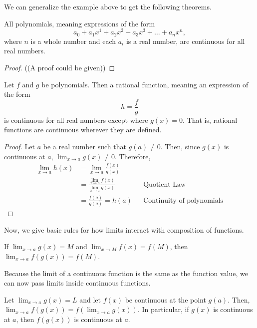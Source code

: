 \documentclass{ximera}
\begin{document}
We can generalize the example above to get the following theorems.

\begin{theorem}
  All polynomials, meaning expressions of the form
  \[
  a_0+a_1x^1+a_2x^2+a_3x^3+\dots+a_nx^n,
  \]
  where $n$ is a whole number and each $a_i$ is a real number, are
  continuous for all real numbers.
  \begin{proof}
   ((A proof could be given))
  \end{proof}
\end{theorem}

\begin{theorem} 
  Let $f$ and $g$ be polynomials.  Then a rational function, meaning an
  expression of the form
  \[
  h=\frac{f}{g}
  \]
  is continuous for all real numbers except where $g(x)=0$.  That is,
  rational functions are continuous wherever they are defined.

\begin{proof}
      Let $a$ be a real number such that $g(a)\neq 0$.  Then, since
      $g(x)$ is continuous at $a$, $\lim_{x\to a} g(x) \neq 0$.
      Therefore,
      \begin{align*}
        \lim_{x \to a} h(x) &= \lim_{x\to a} \frac{f(x)}{g(x)} &&\\
        &= \frac{\lim_{x\to a} f(x)}{ \lim_{x\to a} g(x)} && \text{Quotient Law}\\
        &= \frac{f(a)}{g(a)}=h(a) && \text{Continuity of polynomials}
      \end{align*}
\end{proof}
\end{theorem}


Now, we give basic rules for how limits interact with composition
of functions.

\begin{theorem}
  If $\lim_{x\to a}g(x)=M$ and $\lim_{x\to M}f(x) = f(M)$, then
  $\lim_{x\to a} f(g(x)) = f(M)$.
\end{theorem}

Because the limit of a continuous function is the same as the function
value, we can now pass limits inside continuous functions.

\begin{theorem}\label{theorem:continuity}
Let $\lim_{x\to a} g(x) = L$ and let $f(x)$ be continuous at the point
$g(a)$.  Then, $\lim_{x\to a} f(g(x)) = f(\lim_{x\to a} g(x))$.  In
particular, if $g(x)$ is continuous at $a$, then $f(g(x))$ is
continuous at $a$.
\end{theorem}
\end{document}

